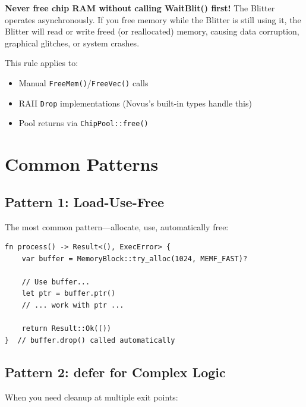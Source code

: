 \begin{warningbox}
\textbf{Never free chip RAM without calling WaitBlit() first!} The Blitter operates asynchronously. If you free memory while the Blitter is still using it, the Blitter will read or write freed (or reallocated) memory, causing data corruption, graphical glitches, or system crashes.

This rule applies to:
\begin{itemize}
    \item Manual \texttt{FreeMem()}/\texttt{FreeVec()} calls
    \item RAII \texttt{Drop} implementations (Novus's built-in types handle this)
    \item Pool returns via \texttt{ChipPool::free()}
\end{itemize}
\end{warningbox}

\section{Common Patterns}
\label{sec:memory-patterns}

\subsection{Pattern 1: Load-Use-Free}

The most common pattern---allocate, use, automatically free:

\begin{lstlisting}
fn process() -> Result<(), ExecError> {
    var buffer = MemoryBlock::try_alloc(1024, MEMF_FAST)?

    // Use buffer...
    let ptr = buffer.ptr()
    // ... work with ptr ...

    return Result::Ok(())
}  // buffer.drop() called automatically
\end{lstlisting}

\subsection{Pattern 2: defer for Complex Logic}

When you need cleanup at multiple exit points:

